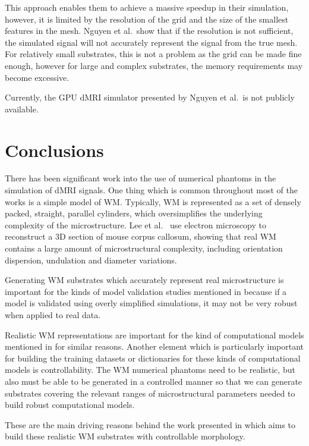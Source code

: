 This approach enables them to achieve a massive speedup in their simulation, however, it is limited by the resolution of the grid and the size of the smallest features in the mesh.
Nguyen et al.\ show that if the resolution is not sufficient, the simulated signal will not accurately represent the signal from the true mesh.
For relatively small substrates, this is not a problem as the grid can be made fine enough, however for large and complex substrates, the memory requirements may become excessive.

Currently, the \ac{GPU} \ac{dMRI} simulator presented by Nguyen et al.\ is not publicly available. 


\section{Conclusions}
\label{sec:review_conclusions}
There has been significant work into the use of numerical phantoms in the simulation of \acl{dMRI} signals.
One thing which is common throughout most of the works is a simple model of \ac{WM}.
Typically, \ac{WM} is represented as a set of densely packed, straight, parallel cylinders, which oversimplifies the underlying complexity of the microstructure.
Lee et al.\ \cite{Lee2018a} use electron microscopy to reconstruct a 3D section of mouse corpus callosum, showing that real \ac{WM} contains a large amount of microstructural complexity, including orientation dispersion, undulation and diameter variations.

Generating \ac{WM} substrates which accurately represent real microstructure is important for the kinds of model validation studies mentioned in  because if a model is validated using overly simplified simulations, it may not be very robust when applied to real data.

Realistic \ac{WM} representations are important for the kind of computational models mentioned in  for similar reasons.
Another element which is particularly important for building the training datasets or dictionaries for these kinds of computational models is controllability.
The \ac{WM} numerical phantoms need to be realistic, but also must be able to be generated in a controlled manner so that we can generate substrates covering the relevant ranges of microstructural parameters needed to build robust computational models.

These are the main driving reasons behind the work presented in  which aims to build these realistic \ac{WM} substrates with controllable morphology.


